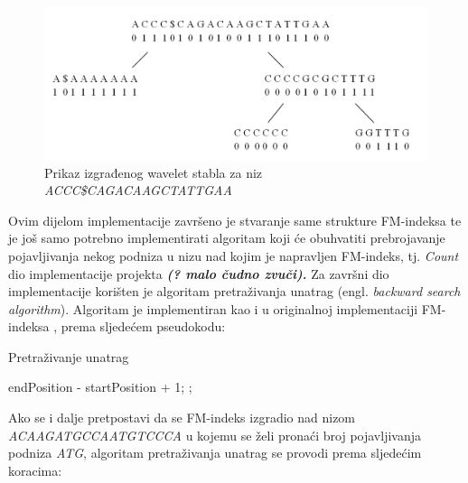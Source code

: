 \begin{figure}[H]
\centering
\includegraphics[width=\linewidth]{./pictures/fmStablo.png}
\caption{Prikaz izgrađenog wavelet stabla za niz \emph{ACCC\$CAGACAAGCTATTGAA}}\label{fmWaveletTree}
\end{figure}

Ovim dijelom implementacije završeno je stvaranje same strukture FM-indeksa te je još samo potrebno implementirati algoritam koji će obuhvatiti prebrojavanje pojavljivanja nekog podniza u nizu nad kojim je napravljen FM-indeks, tj. \emph{Count} dio implementacije projekta \textbf{\emph{(? malo čudno zvuči).}}
Za završni dio implementacije korišten je algoritam pretraživanja unatrag (engl. \emph{backward search algorithm}). Algoritam je implementiran kao i u originalnoj implementaciji FM-indeksa \cite{fm1}, prema sljedećem pseudokodu:


\begin{algorithm}
\caption{ Pretraživanje unatrag }
\label{algo:bws}
\begin{algorithmic}
\ENDFOR
{}
\RETURN endPosition - startPosition + 1;
\ELSE
{};
\ENDIF
\end{algorithmic}
\end{algorithm}





Ako se i dalje pretpostavi da se FM-indeks izgradio nad nizom \emph{ACAAGATGCCAATGTCCCA}  u kojemu se želi pronaći broj pojavljivanja podniza \emph{ATG}, algoritam pretraživanja unatrag se provodi prema sljedećim koracima:


